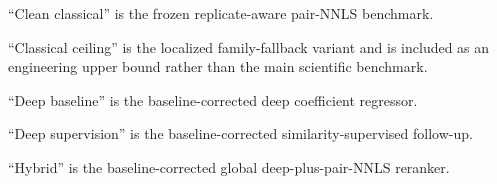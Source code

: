 \documentclass[11pt]{article}
\begin{document}
\begin{table}[ht]
\begin{threeparttable}
\begin{tablenotes}\footnotesize
\item ``Clean classical'' is the frozen replicate-aware pair-NNLS benchmark.
\item ``Classical ceiling'' is the localized family-fallback variant and is included as an engineering upper bound rather than the main scientific benchmark.
\item ``Deep baseline'' is the baseline-corrected deep coefficient regressor.
\item ``Deep supervision'' is the baseline-corrected similarity-supervised follow-up.
\item ``Hybrid'' is the baseline-corrected global deep-plus-pair-NNLS reranker.
\end{tablenotes}
\end{threeparttable}
\end{table}
\end{document}
